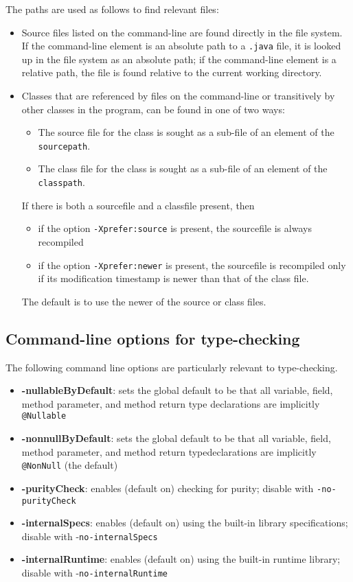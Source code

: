 The paths are used as follows to find relevant files:
\begin{itemize}[noitemsep,nolistsep]
\item Source files listed on the command-line are found directly in the file system. 
If the command-line element is an absolute path to a \texttt{.java} file, it is looked up in the file system as an absolute path; 
if the command-line element is a relative path, the file is found relative to the current working directory.
\item Classes that are referenced by files on the command-line or transitively by other classes in the program, can be found in one of two ways:
\begin{itemize}[noitemsep,nolistsep]
\item The source file for the class is sought as a sub-file of an element of the \texttt{sourcepath}.
\item The class file for the class is sought as a sub-file of an element of the \texttt{classpath}.
\end{itemize}
If there is both a sourcefile and a classfile present, then
\begin{itemize}[nolistsep,noitemsep]
\item if the option \texttt{-Xprefer:source} is present, the sourcefile is always recompiled
\item if the option \texttt{-Xprefer:newer} is present, the sourcefile is recompiled only if its modification timestamp is newer than that of the class file.
\end{itemize}
The default is to use the newer of the source or class files.
\end{itemize}





\subsection{Command-line options for type-checking}

The following command line options are particularly relevant to type-checking.
\begin{itemize}[noitemsep,nolistsep]
\item \textbf{-nullableByDefault}: sets the global default to be that all variable, field, method parameter, and method return type declarations are implicitly \texttt{@Nullable}
\item \textbf{-nonnullByDefault}: sets the global default to be that all variable, field, method parameter, and method return typedeclarations are implicitly \texttt{@NonNull} (the default)
\item \textbf{-purityCheck}: enables (default on) checking for purity; disable with \texttt{-no-purityCheck}
\item \textbf{-internalSpecs}: enables (default on) using the built-in library specifications; disable with -\texttt{no-internalSpecs}
\item \textbf{-internalRuntime}: enables (default on) using the built-in runtime library; disable with -\texttt{no-internalRuntime}
\end{itemize}



